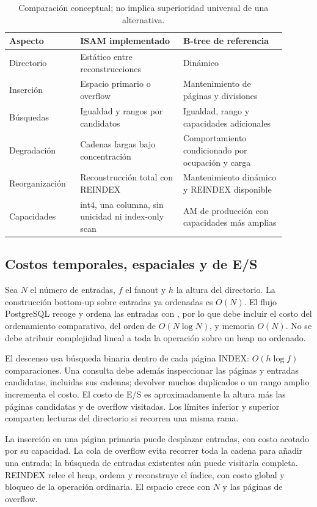 \documentclass[11pt,a4paper]{article}
\newcommand{\code}[1]{\texttt{\detokenize{#1}}}
\begin{document}
\begin{table}[h]
\centering\small
\begin{tabular}{p{0.22\linewidth}p{0.34\linewidth}p{0.34\linewidth}}
\toprule Aspecto & ISAM implementado & B-tree de referencia\\\midrule
Directorio & Estático entre reconstrucciones & Dinámico\\
Inserción & Espacio primario o overflow & Mantenimiento de páginas y divisiones\\
Búsquedas & Igualdad y rangos por candidatos & Igualdad, rango y capacidades adicionales\\
Degradación & Cadenas largas bajo concentración & Comportamiento condicionado por ocupación y carga\\
Reorganización & Reconstrucción total con REINDEX & Mantenimiento dinámico y REINDEX disponible\\
Capacidades & int4, una columna, sin unicidad ni index-only scan & AM de producción con capacidades más amplias\\\bottomrule
\end{tabular}
\caption{Comparación conceptual; no implica superioridad universal de una alternativa.}
\end{table}

\subsection{Costos temporales, espaciales y de E/S}
Sea $N$ el número de entradas, $f$ el fanout y $h$ la altura del directorio. La
construcción bottom-up sobre entradas ya ordenadas es $O(N)$. El flujo PostgreSQL
recoge y ordena las entradas con \code{qsort}, por lo que debe incluir el costo del
ordenamiento comparativo, del orden de $O(N\log N)$, y memoria $O(N)$. No se debe
atribuir complejidad lineal a toda la operación \code{CREATE INDEX} sobre un heap
no ordenado.

El descenso usa búsqueda binaria dentro de cada página INDEX: $O(h\log f)$
comparaciones. Una consulta debe además inspeccionar las páginas y entradas
candidatas, incluidas sus cadenas; devolver muchos duplicados o un rango amplio
incrementa el costo. El costo de E/S es aproximadamente la altura más las páginas
candidatas y de overflow visitadas. Los límites inferior y superior comparten
lecturas del directorio si recorren una misma rama.

La inserción en una página primaria puede desplazar entradas, con costo acotado
por su capacidad. La cola de overflow evita recorrer toda la cadena para añadir
una entrada; la búsqueda de entradas existentes aún puede visitarla completa.
REINDEX relee el heap, ordena y reconstruye el índice, con costo global y bloqueo
de la operación ordinaria. El espacio crece con $N$ y las páginas de overflow.
\end{document}
